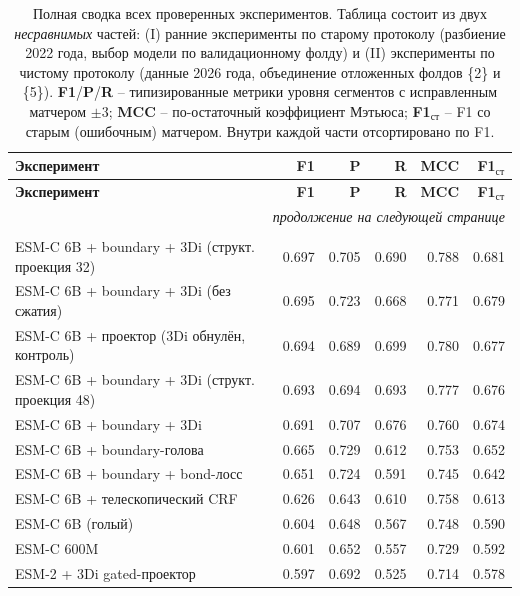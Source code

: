 \begin{longtable}{p{7.2cm} r r r r r}
\caption{Полная сводка всех проверенных экспериментов. Таблица состоит из двух \emph{несравнимых} частей: (I) ранние эксперименты по старому протоколу (разбиение 2022 года, выбор модели по валидационному фолду) и (II) эксперименты по чистому протоколу (данные 2026 года, объединение отложенных фолдов \{2\} и \{5\}). \textbf{F1}/\textbf{P}/\textbf{R} -- типизированные метрики уровня сегментов с исправленным матчером $\pm3$; \textbf{MCC} -- по-остаточный коэффициент Мэтьюса; \textbf{F1$_{\text{ст}}$} -- F1 со старым (ошибочным) матчером. Внутри каждой части отсортировано по F1.}\label{tab:allexp}\\
\hline
\textbf{Эксперимент} & \textbf{F1} & \textbf{P} & \textbf{R} & \textbf{MCC} & \textbf{F1$_{\text{ст}}$} \\
\hline
\endfirsthead
\hline
\textbf{Эксперимент} & \textbf{F1} & \textbf{P} & \textbf{R} & \textbf{MCC} & \textbf{F1$_{\text{ст}}$} \\
\hline
\endhead
\hline \multicolumn{6}{r}{\footnotesize\itshape продолжение на следующей странице}\\ \endfoot
\hline \endlastfoot
\multicolumn{6}{l}{\textbf{\small (II) Чистый протокол (2026, объединение фолдов \{2\} и \{5\})}}\\ \hline
ESM-C 6B + boundary + 3Di (структ. проекция 32) & 0.697 & 0.705 & 0.690 & 0.788 & 0.681 \\
ESM-C 6B + boundary + 3Di (без сжатия) & 0.695 & 0.723 & 0.668 & 0.771 & 0.679 \\
ESM-C 6B + проектор (3Di обнулён, контроль) & 0.694 & 0.689 & 0.699 & 0.780 & 0.677 \\
ESM-C 6B + boundary + 3Di (структ. проекция 48) & 0.693 & 0.694 & 0.693 & 0.777 & 0.676 \\
ESM-C 6B + boundary + 3Di & 0.691 & 0.707 & 0.676 & 0.760 & 0.674 \\
ESM-C 6B + boundary-голова & 0.665 & 0.729 & 0.612 & 0.753 & 0.652 \\
ESM-C 6B + boundary + bond-лосс & 0.651 & 0.724 & 0.591 & 0.745 & 0.642 \\
ESM-C 6B + телескопический CRF & 0.626 & 0.643 & 0.610 & 0.758 & 0.613 \\
ESM-C 6B (голый) & 0.604 & 0.648 & 0.567 & 0.748 & 0.590 \\
ESM-C 600M & 0.601 & 0.652 & 0.557 & 0.729 & 0.592 \\
ESM-2 + 3Di gated-проектор & 0.597 & 0.692 & 0.525 & 0.714 & 0.578 \\

\end{longtable}
